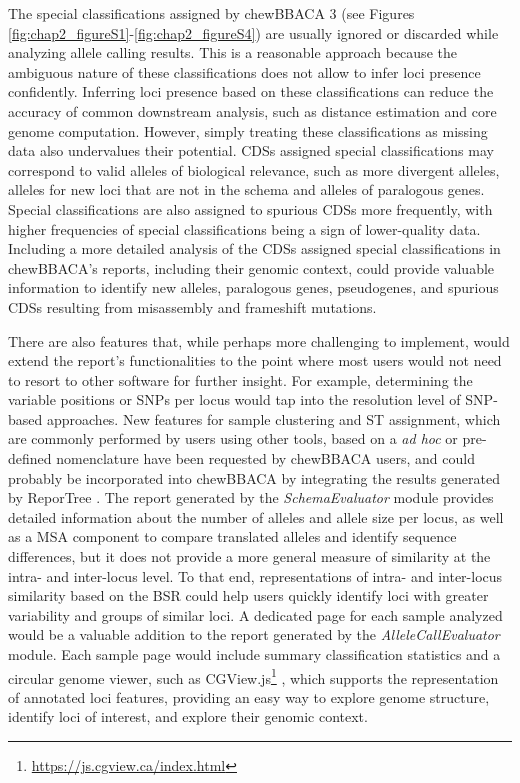 The special classifications assigned by chewBBACA 3 (see Figures \ref{fig:chap2_figureS1}-\ref{fig:chap2_figureS4}) are usually ignored or discarded while analyzing allele calling results. This is a reasonable approach because the ambiguous nature of these classifications does not allow to infer loci presence confidently. Inferring loci presence based on these classifications can reduce the accuracy of common downstream analysis, such as distance estimation and core genome computation. However, simply treating these classifications as missing data also undervalues their potential. \acp{CDS} assigned special classifications may correspond to valid alleles of biological relevance, such as more divergent alleles, alleles for new loci that are not in the schema and alleles of paralogous genes. Special classifications are also assigned to spurious \acp{CDS} more frequently, with higher frequencies of special classifications being a sign of lower-quality data. Including a more detailed analysis of the \acp{CDS} assigned special classifications in chewBBACA's reports, including their genomic context, could provide valuable information to identify new alleles, paralogous genes, pseudogenes, and spurious \acp{CDS} resulting from misassembly and frameshift mutations.

There are also features that, while perhaps more challenging to implement, would extend the report's functionalities to the point where most users would not need to resort to other software for further insight. For example, determining the variable positions or \acp{SNP} per locus would tap into the resolution level of \ac{SNP}-based approaches. New features for sample clustering and \ac{ST} assignment, which are commonly performed by users using other tools, based on a \textit{ad hoc} or pre-defined nomenclature have been requested by chewBBACA users, and could probably be incorporated into chewBBACA by integrating the results generated by ReporTree \cite{mixao_reportree_2023}. The report generated by the \textit{SchemaEvaluator} module provides detailed information about the number of alleles and allele size per locus, as well as a \ac{MSA} component to compare translated alleles and identify sequence differences, but it does not provide a more general measure of similarity at the intra- and inter-locus level. To that end, representations of intra- and inter-locus similarity based on the \ac{BSR} could help users quickly identify loci with greater variability and groups of similar loci. A dedicated page for each sample analyzed would be a valuable addition to the report generated by the \textit{AlleleCallEvaluator} module. Each sample page would include summary classification statistics and a circular genome viewer, such as CGView.js\footnote{\url{https://js.cgview.ca/index.html}} \cite{stothard_visualizing_2019}, which supports the representation of annotated loci features, providing an easy way to explore genome structure, identify loci of interest, and explore their genomic context.

